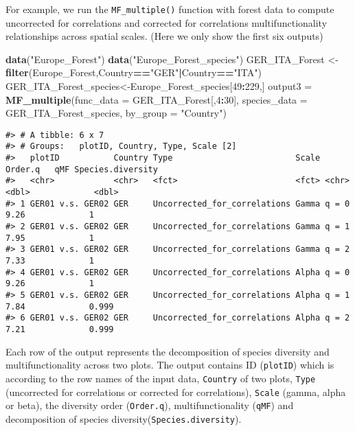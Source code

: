 \documentclass[
]{article}
\newenvironment{Shaded}{\begin{snugshade}}{\end{snugshade}}
\newcommand{\AttributeTok}[1]{\textcolor[rgb]{0.13,0.29,0.53}{#1}}
\newcommand{\DecValTok}[1]{\textcolor[rgb]{0.00,0.00,0.81}{#1}}
\newcommand{\FunctionTok}[1]{\textcolor[rgb]{0.13,0.29,0.53}{\textbf{#1}}}
\newcommand{\NormalTok}[1]{#1}
\newcommand{\OtherTok}[1]{\textcolor[rgb]{0.56,0.35,0.01}{#1}}
\newcommand{\SpecialCharTok}[1]{\textcolor[rgb]{0.81,0.36,0.00}{\textbf{#1}}}
\newcommand{\StringTok}[1]{\textcolor[rgb]{0.31,0.60,0.02}{#1}}
\begin{document}
For example, we run the \texttt{MF\_multiple()} function with forest
data to compute uncorrected for correlations and corrected for
correlations multifunctionality relationships across spatial scales.
(Here we only show the first six outputs)

\begin{Shaded}
\begin{Highlighting}[]
\FunctionTok{data}\NormalTok{(}\StringTok{"Europe\_Forest"}\NormalTok{)}
\FunctionTok{data}\NormalTok{(}\StringTok{"Europe\_Forest\_species"}\NormalTok{)}
\NormalTok{GER\_ITA\_Forest }\OtherTok{\textless{}{-}} \FunctionTok{filter}\NormalTok{(Europe\_Forest,Country}\SpecialCharTok{==}\StringTok{"GER"}\SpecialCharTok{|}\NormalTok{Country}\SpecialCharTok{==}\StringTok{"ITA"}\NormalTok{)}
\NormalTok{GER\_ITA\_Forest\_species}\OtherTok{\textless{}{-}}\NormalTok{Europe\_Forest\_species[}\DecValTok{49}\SpecialCharTok{:}\DecValTok{229}\NormalTok{,]}
\NormalTok{output3 }\OtherTok{=} \FunctionTok{MF\_multiple}\NormalTok{(}\AttributeTok{func\_data =}\NormalTok{ GER\_ITA\_Forest[,}\DecValTok{4}\SpecialCharTok{:}\DecValTok{30}\NormalTok{],}
                      \AttributeTok{species\_data =}\NormalTok{ GER\_ITA\_Forest\_species,}
                      \AttributeTok{by\_group =} \StringTok{"Country"}\NormalTok{)}
\end{Highlighting}
\end{Shaded}

\begin{verbatim}
#> # A tibble: 6 x 7
#> # Groups:   plotID, Country, Type, Scale [2]
#>   plotID           Country Type                         Scale Order.q   qMF Species.diversity
#>   <chr>            <chr>   <fct>                        <fct> <chr>   <dbl>             <dbl>
#> 1 GER01 v.s. GER02 GER     Uncorrected_for_correlations Gamma q = 0    9.26             1    
#> 2 GER01 v.s. GER02 GER     Uncorrected_for_correlations Gamma q = 1    7.95             1    
#> 3 GER01 v.s. GER02 GER     Uncorrected_for_correlations Gamma q = 2    7.33             1    
#> 4 GER01 v.s. GER02 GER     Uncorrected_for_correlations Alpha q = 0    9.26             1    
#> 5 GER01 v.s. GER02 GER     Uncorrected_for_correlations Alpha q = 1    7.84             0.999
#> 6 GER01 v.s. GER02 GER     Uncorrected_for_correlations Alpha q = 2    7.21             0.999
\end{verbatim}

Each row of the output represents the decomposition of species diversity
and multifunctionality across two plots. The output contains ID
(\texttt{plotID}) which is according to the row names of the input data,
\texttt{Country} of two plots, \texttt{Type} (uncorrected for
correlations or corrected for correlations), \texttt{Scale} (gamma,
alpha or beta), the diversity order (\texttt{Order.q}),
multifunctionality (\texttt{qMF}) and decomposition of species
diversity(\texttt{Species.diversity}).
\end{document}
